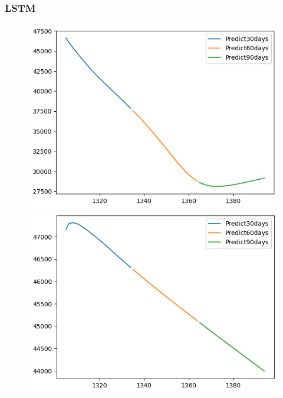 \subsubsection{LSTM}
\begin{figure}[H]
    \centering
    \begin{minipage}{0.15\textwidth}
    \centering
    \includegraphics[width=1\textwidth]{resources/chapter-5/newdata1/predicted/BIDV_LSTM_7-3_30days.png}
    \end{minipage}
    \hfill
    \begin{minipage}{0.15\textwidth}
    \centering
    \includegraphics[width=1\textwidth]{resources/chapter-5/newdata1/predicted/BIDV_LSTM_8-2_30days.png}
    \end{minipage}

\end{figure}
